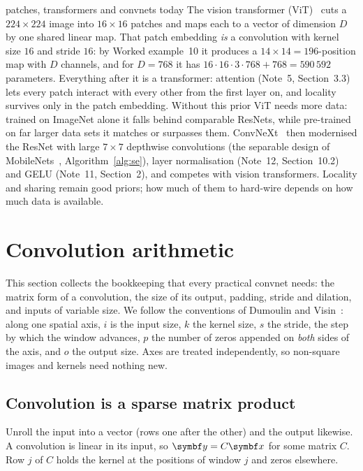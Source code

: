 \documentclass[11pt]{article}
\newcommand{\y}{\vect{y}}
\begin{document}
\begin{modern}{patches, transformers and convnets today}
The vision transformer (ViT)~\cite{dosovitskiy2021} cuts a $224 \times 224$ image into $16 \times 16$ patches and maps
each to a vector of dimension $D$ by one shared linear map. That patch embedding \emph{is} a convolution with kernel size
$16$ and stride $16$: by Worked example~10 it produces a $14 \times 14 = 196$-position
map with $D$ channels, and for $D = 768$ it has $16 \cdot 16 \cdot 3 \cdot 768 + 768 = 590\,592$ parameters. Everything
after it is a transformer: attention (Note~5, Section~3.3) lets every patch interact with every other from the first layer on, and locality
survives only in the patch embedding. Without this prior ViT needs more data: trained on ImageNet alone it falls behind
comparable ResNets, while pre-trained on far larger data sets it matches or surpasses them. ConvNeXt~\cite{liu2022} then
modernised the ResNet with large $7 \times 7$ depthwise convolutions (the separable design of
MobileNets~\cite{howard2017}, Algorithm~\ref{alg:se}), layer normalisation (Note~12, Section~10.2) and GELU (Note~11,
Section~2), and competes with vision transformers. Locality and sharing remain good priors; how much of them to hard-wire depends on
how much data is available.
\end{modern}

\section{Convolution arithmetic}\label{sec:arith}

This section collects the bookkeeping that every practical convnet needs: the matrix form of a convolution, the size of
its output, padding, stride and dilation, and inputs of variable size. We follow the conventions of Dumoulin and
Visin~\cite{dumoulin2016}: along one spatial axis, $i$ is the input size, $k$ the kernel size, $s$ the stride, the step
by which the window advances, $p$ the number of zeros appended on \emph{both} sides of the axis, and $o$ the output
size. Axes are treated independently, so non-square images and kernels
need nothing new.

\subsection{Convolution is a sparse matrix product}\label{sec:matrix}

Unroll the input into a vector (rows one after the other) and the output likewise. A convolution is linear in its input,
so $\y = C\x$ for some matrix $C$. Row $j$ of $C$ holds the kernel at the positions of window $j$ and zeros elsewhere.
\end{document}

